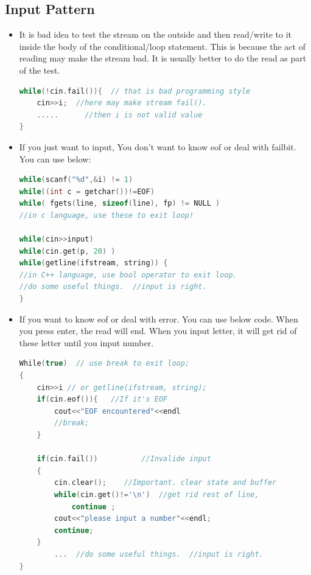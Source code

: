 \documentclass[a4paper,12pt,twoside]{book}
\begin{document}
\subsection{Input Pattern}

\begin{itemize}
	\item It is bad idea to test the stream on the outside and then read/write to it inside the body of the conditional/loop statement. This is because the act of reading may make the stream bad. It is usually better to do the read as part of the test.
	
\begin{lstlisting}[frame=single, language=c++]
while(!cin.fail()){  // that is bad programming style
	cin>>i;  //here may make stream fail().
	.....      //then i is not valid value
}
\end{lstlisting}
	
	\item If you just want to input, You don't want to know eof or deal with failbit. You can use below: \\
	
\begin{lstlisting}[frame=single, language=c++]
while(scanf("%d",&i) != 1)
while((int c = getchar())!=EOF)
while( fgets(line, sizeof(line), fp) != NULL )
//in c language, use these to exit loop!
	
while(cin>>input)
while(cin.get(p, 20) )
while(getline(ifstream, string)) {
//in C++ language, use bool operator to exit loop.
//do some useful things.  //input is right.
}
\end{lstlisting}
	
	\item If you want to know eof or deal with error. You can use below code. When you press enter, the read will end. When you input letter, it will get rid of these letter until you input number. 
\begin{lstlisting}[frame=single, language=c++]
While(true)  // use break to exit loop;
{
	cin>>i // or getline(ifstream, string);
	if(cin.eof()){   //If it's EOF
		cout<<"EOF encountered"<<endl
		//break;
	}

	if(cin.fail())          //Invalide input
	{
		cin.clear();    //Important. clear state and buffer
		while(cin.get()!='\n')  //get rid rest of line,
			continue ;
		cout<<"please input a number"<<endl;
		continue;
	}
		...  //do some useful things.  //input is right.
}
\end{lstlisting}


\end{itemize}
\end{document}
